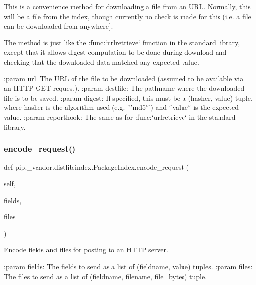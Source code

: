 \begin{DoxyVerb}This is a convenience method for downloading a file from an URL.
Normally, this will be a file from the index, though currently
no check is made for this (i.e. a file can be downloaded from
anywhere).

The method is just like the :func:`urlretrieve` function in the
standard library, except that it allows digest computation to be
done during download and checking that the downloaded data
matched any expected value.

:param url: The URL of the file to be downloaded (assumed to be
    available via an HTTP GET request).
:param destfile: The pathname where the downloaded file is to be
         saved.
:param digest: If specified, this must be a (hasher, value)
       tuple, where hasher is the algorithm used (e.g.
       ``'md5'``) and ``value`` is the expected value.
:param reporthook: The same as for :func:`urlretrieve` in the
           standard library.
\end{DoxyVerb}
 \mbox{\label{classpip_1_1__vendor_1_1distlib_1_1index_1_1PackageIndex_afa787474bf34ee59d4a4e599b0099f11}} 
\subsubsection{\texorpdfstring{encode\+\_\+request()}{encode\_request()}}
{\footnotesize\ttfamily def pip.\+\_\+vendor.\+distlib.\+index.\+Package\+Index.\+encode\+\_\+request (\begin{DoxyParamCaption}\item[{}]{self,  }\item[{}]{fields,  }\item[{}]{files }\end{DoxyParamCaption})}

\begin{DoxyVerb}Encode fields and files for posting to an HTTP server.

:param fields: The fields to send as a list of (fieldname, value)
       tuples.
:param files: The files to send as a list of (fieldname, filename,
      file_bytes) tuple.
\end{DoxyVerb}
 \mbox{\label{classpip_1_1__vendor_1_1distlib_1_1index_1_1PackageIndex_a87351a65052ac2a0b4d3e9009bc181b7}} 
